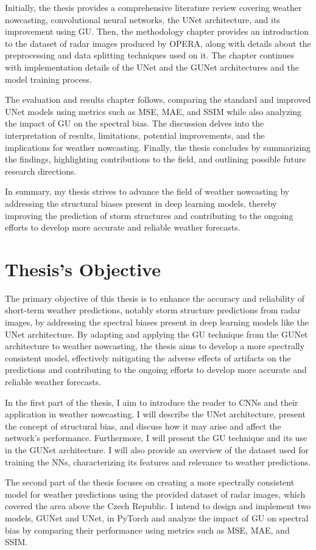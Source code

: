 Initially, the thesis provides a comprehensive literature review covering weather nowcasting, convolutional neural networks, the UNet architecture, and its improvement using \gls{GU}. Then, the methodology chapter provides an introduction to the dataset of radar images produced by \gls{OPERA}, along with details about the preprocessing and data splitting techniques used on it. The chapter continues with implementation details of the UNet and the \gls{GUNet} architectures and the model training process.

The evaluation and results chapter follows, comparing the standard and improved UNet models using metrics such as \gls{MSE}, \gls{MAE}, and \gls{SSIM} while also analyzing the impact of \gls{GU} on the spectral bias. The discussion delves into the interpretation of results, limitations, potential improvements, and the implications for weather nowcasting. Finally, the thesis concludes by summarizing the findings, highlighting contributions to the field, and outlining possible future research directions.

In summary, my thesis strives to advance the field of weather nowcasting by addressing the structural biases present in deep learning models,
thereby improving the prediction of storm structures and contributing to the ongoing efforts to develop more accurate and reliable weather forecasts.

\chapter{Thesis's Objective}
\label{chap:objective}

The primary objective of this thesis is to enhance the accuracy and reliability of short-term weather predictions, notably storm structure predictions from radar images, by addressing the spectral biases present in deep learning models like the UNet architecture. By adapting and applying the \gls{GU} technique from the \gls{GUNet} architecture to weather nowcasting, the thesis aims to develop a more spectrally consistent model, effectively mitigating the adverse effects of artifacts on the predictions and contributing to the ongoing efforts to develop more accurate and reliable weather forecasts.

In the first part of the thesis, I aim to introduce the reader to \glspl{CNN} and their application in weather nowcasting. I will describe the UNet architecture, present the concept of structural bias, and discuss how it may arise and affect the network's performance. Furthermore, I will present the \gls{GU} technique and its use in the \gls{GUNet} architecture. I will also provide an overview of the dataset used for training the \glspl{NN}, characterizing its features and relevance to weather predictions.

The second part of the thesis focuses on creating a more spectrally consistent model for weather predictions using the provided dataset of radar images, which covered the area above the Czech Republic. I intend to design and implement two models, \gls{GUNet} and UNet, in PyTorch and analyze the impact of \gls{GU} on spectral bias by comparing their performance using metrics such as \gls{MSE}, \gls{MAE}, and \gls{SSIM}.
